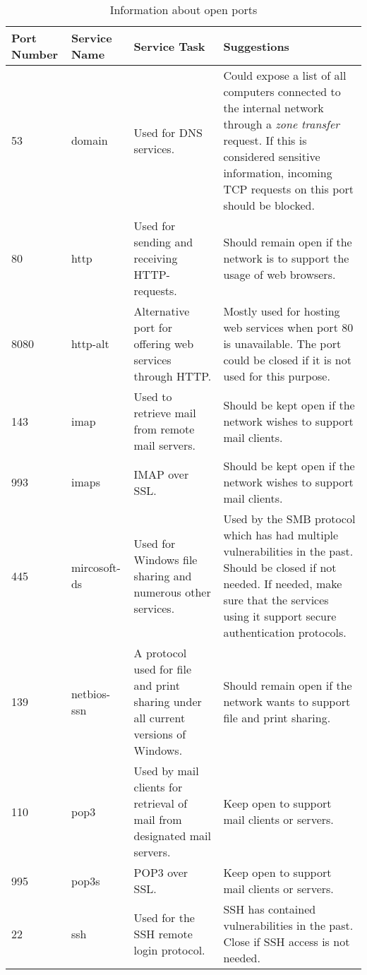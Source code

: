 \begin{table}[htb]
 \centering
 \caption{Information about open ports} \label{tab:open_ports}
 \begin{tabular}{m{1.8cm}m{1.5cm}p{5.7cm}p{3.7cm}} \toprule
 \textbf{Port Number} & \textbf{Service Name} & 
 \textbf{Service Task} & 
 \textbf{Suggestions} \\ \midrule
 53 	& domain		& Used for DNS services. & Could expose a list of all computers connected to the internal network through a \textit{zone transfer} request. If this is considered sensitive information, incoming TCP requests on this port should be blocked.\\
 80 	& http			& Used for sending and receiving HTTP-requests. & Should remain open if the network is to support the usage of web browsers.\\
 8080 	& http-alt		& Alternative port for offering web services through HTTP. & Mostly used for hosting web services when port 80 is unavailable. The port could be closed if it is not used for this purpose. \\
 143	& imap			& Used to retrieve mail from remote mail servers. & Should be kept open if the network wishes to support mail clients.\\
 993	& imaps			& IMAP over SSL. & Should be kept open if the network wishes to support mail clients.\\
 445	& mircosoft-ds	& Used for Windows file sharing and numerous other services. & Used by the SMB protocol which has had multiple vulnerabilities in the past. Should be closed if not needed. If needed, make sure that the services using it support secure authentication protocols. \\
 139	& netbios-ssn	& A protocol used for file and print sharing under all current versions of Windows. & Should remain open if the network wants to support file and print sharing. \\
 110	& pop3			& Used by mail clients for retrieval of mail from designated mail servers. & Keep open to support mail clients or servers. \\
 995	& pop3s			& POP3 over SSL. & Keep open to support mail clients or servers. \\ 
 22		& ssh			& Used for the SSH remote login protocol. & SSH has contained vulnerabilities in the past. Close if SSH access is not needed. \\ \bottomrule
 \end{tabular} 
\end{table}


